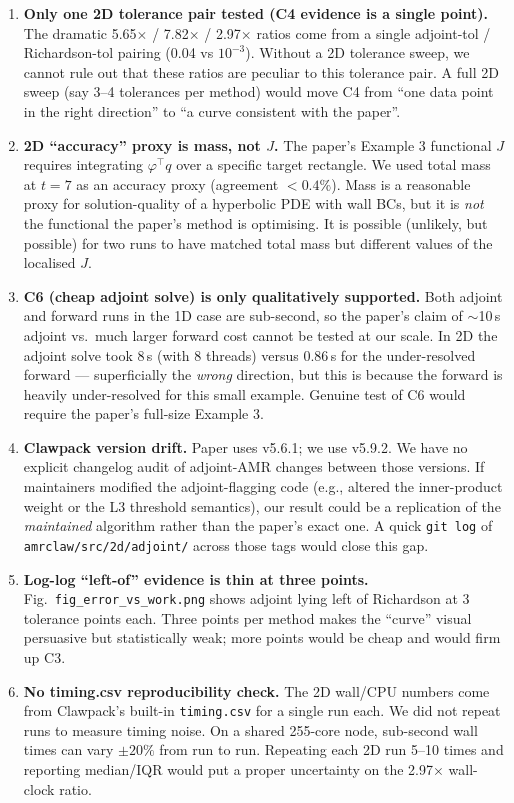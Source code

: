 \documentclass[11pt]{article}
\begin{document}
\begin{enumerate}
\item \textbf{Only one 2D tolerance pair tested (C4 evidence is a single
point).} The dramatic 5.65$\times$ / 7.82$\times$ / 2.97$\times$ ratios come
from a single adjoint-tol / Richardson-tol pairing (0.04 vs $10^{-3}$). Without
a 2D tolerance sweep, we cannot rule out that these ratios are peculiar to this
tolerance pair. A full 2D sweep (say 3--4 tolerances per method) would move
C4 from ``one data point in the right direction'' to ``a curve consistent with
the paper''.

\item \textbf{2D ``accuracy'' proxy is mass, not $J$.} The paper's Example 3
functional $J$ requires integrating $\varphi^\top q$ over a specific target
rectangle. We used total mass at $t=7$ as an accuracy proxy (agreement
$<0.4\%$). Mass is a reasonable proxy for solution-quality of a hyperbolic PDE
with wall BCs, but it is \emph{not} the functional the paper's method is
optimising. It is possible (unlikely, but possible) for two runs to have
matched total mass but different values of the localised $J$.

\item \textbf{C6 (cheap adjoint solve) is only qualitatively supported.} Both
adjoint and forward runs in the 1D case are sub-second, so the paper's claim of
$\sim$10\,s adjoint vs.\ much larger forward cost cannot be tested at our
scale. In 2D the adjoint solve took 8\,s (with 8 threads) versus 0.86\,s for
the under-resolved forward --- superficially the \emph{wrong} direction, but
this is because the forward is heavily under-resolved for this small example.
Genuine test of C6 would require the paper's full-size Example 3.

\item \textbf{Clawpack version drift.} Paper uses v5.6.1; we use v5.9.2. We
have no explicit changelog audit of adjoint-AMR changes between those
versions. If maintainers modified the adjoint-flagging code (e.g., altered the
inner-product weight or the L3 threshold semantics), our result could be a
replication of the \emph{maintained} algorithm rather than the paper's exact
one. A quick \texttt{git log} of \texttt{amrclaw/src/2d/adjoint/} across
those tags would close this gap.

\item \textbf{Log-log ``left-of'' evidence is thin at three points.}
Fig.~\texttt{fig\_error\_vs\_work.png} shows adjoint lying left of Richardson
at 3 tolerance points each. Three points per method makes the ``curve'' visual
persuasive but statistically weak; more points would be cheap and would firm
up C3.

\item \textbf{No timing.csv reproducibility check.} The 2D wall/CPU numbers
come from Clawpack's built-in \texttt{timing.csv} for a single run each. We
did not repeat runs to measure timing noise. On a shared 255-core node,
sub-second wall times can vary $\pm 20\%$ from run to run. Repeating each 2D
run 5--10 times and reporting median/IQR would put a proper uncertainty on the
2.97$\times$ wall-clock ratio.

\end{enumerate}
\end{document}
